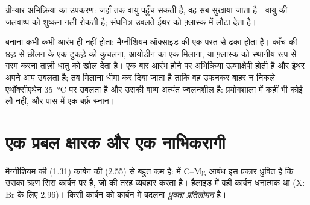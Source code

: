 \begin{omfigure}

{\small ग्रीन्यार अभिक्रिया का उपकरण: जहाँ तक वायु पहुँच सकती है, वह सब
सुखाया जाता है। वायु की जलवाष्प को शुष्कन नली रोकती है;
संघनित्र उबलते ईथर को फ़्लास्क में लौटा देता है।}
\end{omfigure}

\begin{inthelab}[एक अभिक्रिया जिसे आरंभ होना ही है]
 बनाना कभी-कभी आरंभ ही नहीं होता: मैग्नीशियम
ऑक्साइड की एक परत से ढका होता है। काँच की छड़ से छीलन के एक टुकड़े को कुचलना,
आयोडीन का एक  मिलाना, या फ़्लास्क को स्थानीय रूप से गरम करना ताज़ी धातु
को खोल देता है। एक बार आरंभ होने पर अभिक्रिया ऊष्माक्षेपी होती है और ईथर अपने आप उबलता है;
तब मिलाना धीमा कर दिया जाता है ताकि वह उफनकर बाहर न निकले। एथॉक्सीएथेन
\qty{35}{\celsius} पर उबलता है और उसकी वाष्प अत्यंत ज्वलनशील है: प्रयोगशाला में
कहीं भी कोई लौ नहीं, और पास में एक बर्फ़-स्नान।
\end{inthelab}

\section{एक प्रबल क्षारक और एक नाभिकरागी}

\begin{definition}[ध्रुवता प्रतिलोमन]\label{def:b1:organomagnesium:umpolung}
मैग्नीशियम की  (1.31) कार्बन की (2.55) से बहुत कम है:
 में C--Mg आबंध इस प्रकार ध्रुवित है कि उसका ऋण
सिरा कार्बन पर है, जो  की तरह व्यवहार करता है। हैलाइड  में
वही कार्बन धनात्मक था (X: Br के लिए 2.96)। किसी  कार्बन को
 कार्बन में बदलना \emph{ध्रुवता प्रतिलोमन} है।
\end{definition}

